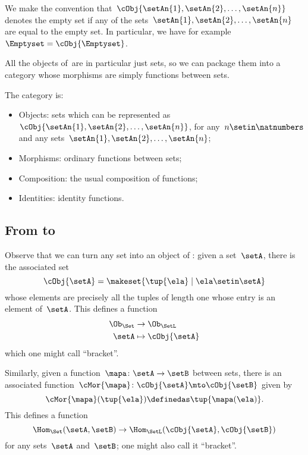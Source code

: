 We make the convention that~$\cObj{\setAn{1}, \setAn{2}, \ldots, \setAn{n}}$ denotes the empty set if any of the sets~$\setAn{1}, \setAn{2}, \ldots , \setAn{n}$ are equal to the empty set.
In particular, we have for example~$\Emptyset = \cObj{\Emptyset}$.

All the objects of~\SetL are in particular just sets, so we can package them into a category whose morphisms are simply functions between sets.

\begin{ctdefinition}[\SetL]
    The category \SetL is:
    \begin{itemize}
        \item Objects: sets which can be represented as~$\cObj{\setAn{1}, \setAn{2}, \ldots, \setAn{n}}$, for any~$n \setin \natnumbers$ and any sets~$\setAn{1}, \setAn{2}, \ldots, \setAn{n}$;
        \item Morphisms: ordinary functions between sets;
        \item Composition: the usual composition of functions;
        \item Identities: identity functions.
    \end{itemize}
\end{ctdefinition}

\subsection{From \Set to~\SetL}

Observe that we can turn any set into an object of \SetL: given a set~$\setA$, there is the associated set
\begin{equation}
    \cObj{\setA} = \makeset{ \tup{\ela} \mid \ela \setin \setA }
\end{equation}
whose elements are precisely all the tuples of length one whose entry is an element of~$\setA$.
This defines a function
\begin{equation}
    \begin{aligned}
        \Ob_{\Set} & \to \Ob_{\SetL} \\
        \setA      & \mapsto \cObj{\setA}
    \end{aligned}
\end{equation}
which one might call ``bracket''.

Similarly, given a function~$\mapa \colon \setA \to \setB$ between sets, there is an associated function~$\cMor{ \mapa }\colon \cObj{\setA} \mto \cObj{\setB}$ given by
\begin{equation}
    \cMor{ \mapa } ( \tup{ \ela }) \definedas \tup{\mapa(\ela)}.
\end{equation}
This defines a function
\begin{equation}
    \Hom_{\Set}(\setA,\setB) \to \Hom_{\SetL}(\cObj{\setA},\cObj{\setB})
\end{equation}
for any sets~$\setA$ and~$\setB$; one might also call it ``bracket''.

